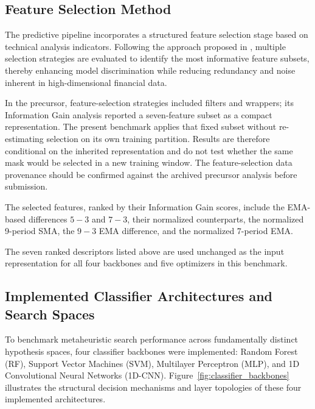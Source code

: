 \subsection{Feature Selection Method}
\label{sec:featureselection}
The predictive pipeline incorporates a structured feature selection stage based on technical analysis indicators. Following the approach proposed in \cite{souza2024dataset}, multiple selection strategies are evaluated to identify the most informative feature subsets, thereby enhancing model discrimination while reducing redundancy and noise inherent in high-dimensional financial data.

In the precursor, feature-selection strategies included filters and wrappers; its Information Gain analysis reported a seven-feature subset as a compact representation. The present benchmark applies that fixed subset without re-estimating selection on its own training partition. Results are therefore conditional on the inherited representation and do not test whether the same mask would be selected in a new training window. The feature-selection data provenance should be confirmed against the archived precursor analysis before submission.

The selected features, ranked by their Information Gain scores, include the EMA-based differences $5\!-\!3$ and $7\!-\!3$, their normalized counterparts, the normalized 9-period SMA, the $9\!-\!3$ EMA difference, and the normalized 7-period EMA. 

The seven ranked descriptors listed above are used unchanged as the input representation for all four backbones and five optimizers in this benchmark.

\subsection{Implemented Classifier Architectures and Search Spaces}
\label{sec:classifier_architectures}

To benchmark metaheuristic search performance across fundamentally distinct hypothesis spaces, four classifier backbones were implemented: Random Forest (RF), Support Vector Machines (SVM), Multilayer Perceptron (MLP), and 1D Convolutional Neural Networks (1D-CNN). Figure~\ref{fig:classifier_backbones} illustrates the structural decision mechanisms and layer topologies of these four implemented architectures.



